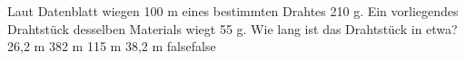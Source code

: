     {Laut Datenblatt wiegen 100 m eines bestimmten Drahtes 210 g. Ein vorliegendes Drahtstück desselben Materials wiegt 55 g. Wie lang ist das Drahtstück in etwa?}
    {26,2 m}
    {382 m}
    {115 m}
    {38,2 m}
    {false}{false}